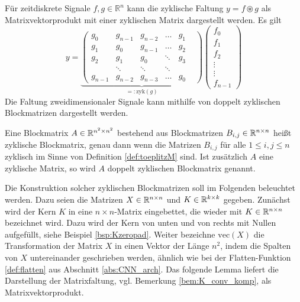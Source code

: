 Für zeitdiskrete Signale $f,g \in \mathbb{R}^{n}$ kann die zyklische Faltung $y=f \circledast g$ als Matrixvektorprodukt mit einer zyklischen Matrix dargestellt werden. Es gilt 
\begin{equation*}
    y=\underbrace{\begin{pmatrix}
        g_0 & g_{n-1} &g_{n-2} &\ldots &g_1 \\ 
        g_1 & g_0 &g_{n-1} &\ldots &g_2 \\
        g_2 &g_1 &g_0 &\ddots &g_3\\
        &\ddots &\ddots &\ddots & & \\
        g_{n-1} &g_{n-2} &g_{n-3} &\ldots &g_0
    \end{pmatrix}}_{=:\mathrm{zyk}(g)}
    \begin{pmatrix}
        f_0 \\
        f_1 \\
        f_2 \\
        \vdots \\
        \vdots \\
        f_{n-1}
    \end{pmatrix}
\end{equation*}
Die Faltung zweidimensionaler Signale kann mithilfe von doppelt zyklischen Blockmatrizen dargestellt werden.
\begin{defi}
    \label{def:double_circ}
    Eine Blockmatrix $A \in \mathbb{R}^{n^2 \times n^2}$ bestehend aus Blockmatrizen $B_{i,j} \in \mathbb{R}^{n \times n}$ heißt zyklische Blockmatrix, genau dann wenn die Matrizen $B_{i,j}$ für alle $ 1 \leq i, j \leq n$ zyklisch im Sinne von Definition \ref{def:toeplitzM} sind. Ist zusätzlich $A$ eine zyklische Matrix, so wird $A$ doppelt zyklischen Blockmatrix genannt.
\end{defi}

Die Konstruktion solcher zyklischen Blockmatrizen soll im Folgenden beleuchtet werden. Dazu seien die Matrizen $X \in \mathbb{R}^{n \times n}$ und $K \in \mathbb{R}^{k \times k}$ gegeben. Zunächst wird der Kern $K$ in eine $n \times n$-Matrix eingebettet, die wieder mit $K \in \mathbb{R}^{n \times n}$ bezeichnet wird. Dazu wird der Kern von unten und von rechts mit Nullen aufgefüllt, siehe Beispiel \ref{bsp:Kzeropad}.
Weiter bezeichne $\mathrm{vec}(X)$ die Transformation der Matrix $X$ in einen Vektor der Länge $n^2$, indem die Spalten von $X$ untereinander geschrieben werden, ähnlich wie bei der Flatten-Funktion \ref{def:flatten} aus Abschnitt \ref{abs:CNN_arch}. Das folgende Lemma liefert die Darstellung der Matrixfaltung, vgl. Bemerkung \ref{bem:K_conv_komp}, als Matrixvektorprodukt.

